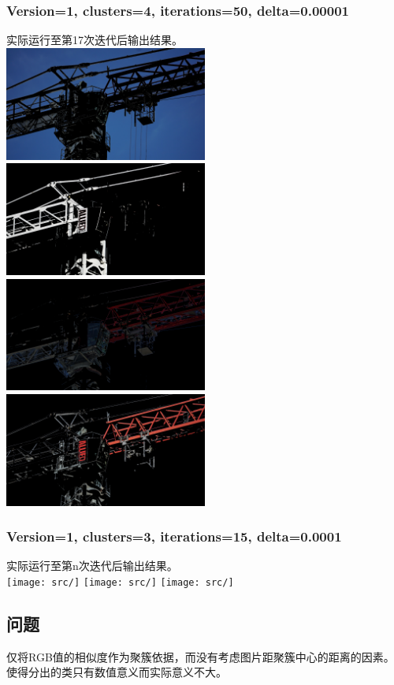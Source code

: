 \documentclass{article}
\begin{document}
\subsubsection{Version=1, clusters=4, iterations=50, delta=0.00001}
实际运行至第17次迭代后输出结果。\\
\includegraphics[width=0.5\textwidth]{src/i17d1e-5section1.png}
\includegraphics[width=0.5\textwidth]{src/i17d1e-5section2.png}\\
\includegraphics[width=0.5\textwidth]{src/i17d1e-5section3.png}
\includegraphics[width=0.5\textwidth]{src/i17d1e-5section4.png}\\

\subsubsection{Version=1, clusters=3, iterations=15, delta=0.0001}
实际运行至第n次迭代后输出结果。\\
\texttt{[image: src/]}
\texttt{[image: src/]}
\texttt{[image: src/]}\\
\subsection{问题}
仅将RGB值的相似度作为聚簇依据，而没有考虑图片距聚簇中心的距离的因素。使得分出的类只有数值意义而实际意义不大。
\end{document}
